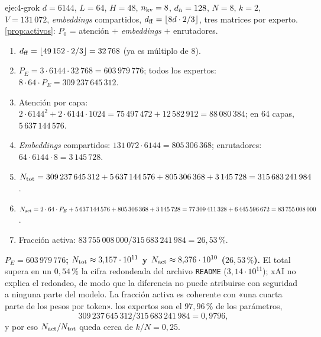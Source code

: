 \begin{solucion}{eje:4-grok}
\datos $d=6144$, $L=64$, $H=48$, $n_{\mathrm{kv}}=8$, $d_{h}=128$, $N=8$, $k=2$, $V=131\,072$, \emph{embeddings} compartidos, $d_{\mathrm{ff}}=\lfloor 8d\cdot 2/3\rfloor$, tres matrices por experto.
\planteamiento \cref{prop:activos}: $P_0$ = atención $+$ \emph{embeddings} $+$ enrutadores.
\pasos
\begin{enumerate}[label=\arabic*.]
  \item $d_{\mathrm{ff}}=\lfloor 49\,152\cdot 2/3\rfloor=32\,768$ (ya es múltiplo de 8).
  \item $P_E=3\cdot 6144\cdot 32\,768=603\,979\,776$; todos los expertos: $8\cdot 64\cdot P_E=309\,237\,645\,312$.
  \item Atención por capa: $2\cdot 6144^{2}+2\cdot 6144\cdot 1024=75\,497\,472+12\,582\,912=88\,080\,384$; en 64 capas, $5\,637\,144\,576$.
  \item \emph{Embeddings} compartidos: $131\,072\cdot 6144=805\,306\,368$; enrutadores: $64\cdot 6144\cdot 8=3\,145\,728$.
  \item $N_{\mathrm{tot}}=309\,237\,645\,312+5\,637\,144\,576+805\,306\,368+3\,145\,728=315\,683\,241\,984$.
  \item $N_{\mathrm{act}}=2\cdot 64\cdot P_E+5\,637\,144\,576+805\,306\,368+3\,145\,728=77\,309\,411\,328+6\,445\,596\,672=83\,755\,008\,000$.
  \item Fracción activa: $83\,755\,008\,000/315\,683\,241\,984=26{,}53\,\%$.
\end{enumerate}
\resultado \textbf{$P_E=603\,979\,776$; $N_{\mathrm{tot}}\approx 3{,}157\cdot 10^{11}$ y $N_{\mathrm{act}}\approx 8{,}376\cdot 10^{10}$ ($26{,}53\,\%$).} El total supera en un $0{,}54\,\%$ la cifra redondeada del archivo \texttt{README} ($3{,}14\cdot 10^{11}$); xAI no explica el redondeo, de modo que la diferencia no puede atribuirse con seguridad a ninguna parte del modelo. La fracción activa es coherente con «una cuarta parte de los pesos por token».
\comprobacion los expertos son el $97{,}96\,\%$ de los parámetros,\[309\,237\,645\,312/315\,683\,241\,984=0{,}9796,\]y por eso $N_{\mathrm{act}}/N_{\mathrm{tot}}$ queda cerca de $k/N=0{,}25$.
\end{solucion}

